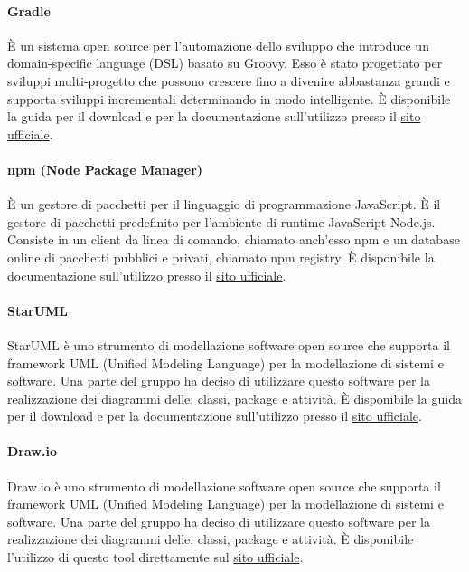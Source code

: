 \paragraph{Gradle}
È un sistema open source per l'automazione dello sviluppo che introduce un domain-specific language (DSL) basato su Groovy.
Esso è stato progettato per sviluppi multi-progetto che possono crescere fino a divenire abbastanza grandi e supporta sviluppi incrementali determinando in modo intelligente.
È disponibile la guida per il download e per la documentazione sull'utilizzo presso il \href{https://gradle.org/}{sito ufficiale}.

\paragraph{npm (Node Package Manager)}
È un gestore di pacchetti per il linguaggio di programmazione JavaScript. È il gestore di pacchetti predefinito per l'ambiente di runtime JavaScript Node.js. 
Consiste in un client da linea di comando, chiamato anch'esso npm e un database online di pacchetti pubblici e privati, chiamato npm registry.
È disponibile la documentazione sull'utilizzo presso il \href{https://www.npmjs.com/}{sito ufficiale}.

\paragraph{StarUML}
StarUML è uno strumento di modellazione software open source che supporta il framework UML (Unified Modeling Language) per la modellazione di sistemi e software. Una parte del gruppo
ha deciso di utilizzare questo software per la realizzazione dei diagrammi delle: classi, package e attività.
È disponibile la guida per il download e per la documentazione sull'utilizzo presso il \href{http://staruml.io/}{sito ufficiale}.

\paragraph{Draw.io}
Draw.io è uno strumento di modellazione software open source che supporta il framework UML (Unified Modeling Language) per la modellazione di sistemi e software. Una parte del gruppo
ha deciso di utilizzare questo software per la realizzazione dei diagrammi delle: classi, package e attività.
È disponibile l'utilizzo di questo tool direttamente sul \href{https://app.diagrams.net/}{sito ufficiale}.